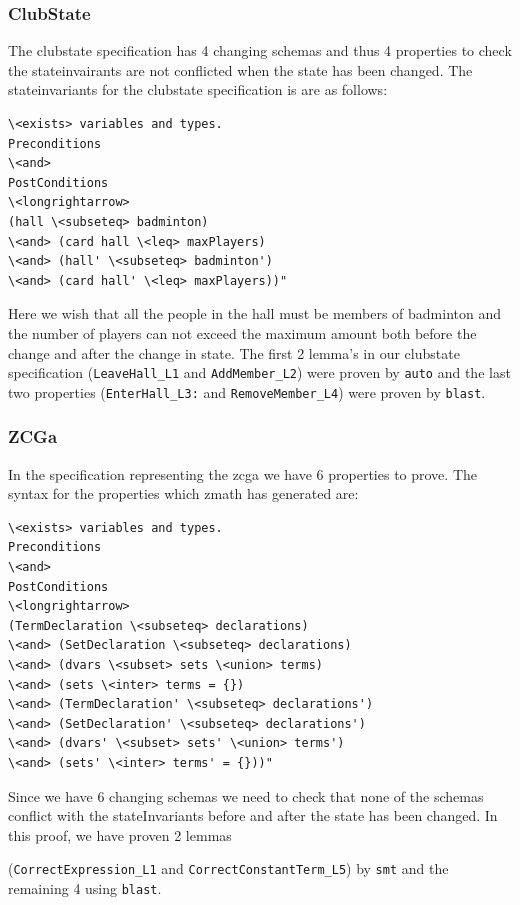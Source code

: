 \subsubsection{ClubState}

The clubstate specification has 4 changing schemas and thus 4 properties to check the stateinvairants are not conflicted when the state has been changed. The stateinvariants for the clubstate specification is are as follows:

\begin{verbatim}
\<exists> variables and types.
Preconditions
\<and>
PostConditions
\<longrightarrow>
(hall \<subseteq> badminton) 
\<and> (card hall \<leq> maxPlayers)
\<and> (hall' \<subseteq> badminton') 
\<and> (card hall' \<leq> maxPlayers))"
\end{verbatim}

Here we wish that all the people in the hall must be members of badminton and the number of players can not exceed the maximum amount both before the change and after the change in state. The first 2 lemma's in our clubstate specification (\verb|LeaveHall_L1| and \verb|AddMember_L2|) were proven by \verb|auto| and the last two properties (\verb|EnterHall_L3:| and \verb|RemoveMember_L4|) were proven by \verb|blast|.

\subsubsection{ZCGa}

In the specification representing the \gls{zcga} we have 6 properties to prove. The syntax for the properties which \gls{zmath} has generated are:

\begin{verbatim}
\<exists> variables and types.
Preconditions
\<and>
PostConditions
\<longrightarrow>
(TermDeclaration \<subseteq> declarations)
\<and> (SetDeclaration \<subseteq> declarations)
\<and> (dvars \<subset> sets \<union> terms)
\<and> (sets \<inter> terms = {})
\<and> (TermDeclaration' \<subseteq> declarations')
\<and> (SetDeclaration' \<subseteq> declarations')
\<and> (dvars' \<subset> sets' \<union> terms')
\<and> (sets' \<inter> terms' = {}))"
\end{verbatim}

Since we have 6 changing schemas we need to check that none of the schemas conflict with the stateInvariants before and after the state has been changed. In this proof, we have proven 2 lemmas

(\verb|CorrectExpression_L1| and \verb|CorrectConstantTerm_L5|) by \verb|smt| and the remaining 4 using \verb|blast|.

